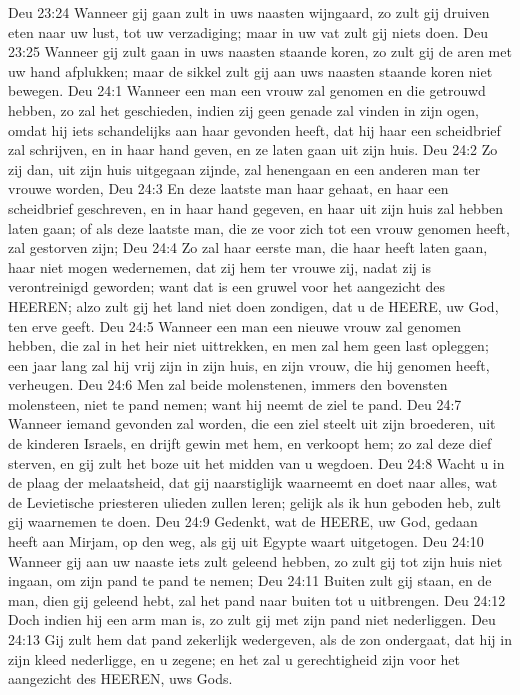 Deu 23:24  Wanneer gij gaan zult in uws naasten wijngaard, zo zult gij druiven eten naar uw lust, tot uw verzadiging; maar in uw vat zult gij niets doen.
Deu 23:25  Wanneer gij zult gaan in uws naasten staande koren, zo zult gij de aren met uw hand afplukken; maar de sikkel zult gij aan uws naasten staande koren niet bewegen.
Deu 24:1  Wanneer een man een vrouw zal genomen en die getrouwd hebben, zo zal het geschieden, indien zij geen genade zal vinden in zijn ogen, omdat hij iets schandelijks aan haar gevonden heeft, dat hij haar een scheidbrief zal schrijven, en in haar hand geven, en ze laten gaan uit zijn huis.
Deu 24:2  Zo zij dan, uit zijn huis uitgegaan zijnde, zal henengaan en een anderen man ter vrouwe worden,
Deu 24:3  En deze laatste man haar gehaat, en haar een scheidbrief geschreven, en in haar hand gegeven, en haar uit zijn huis zal hebben laten gaan; of als deze laatste man, die ze voor zich tot een vrouw genomen heeft, zal gestorven zijn;
Deu 24:4  Zo zal haar eerste man, die haar heeft laten gaan, haar niet mogen wedernemen, dat zij hem ter vrouwe zij, nadat zij is verontreinigd geworden; want dat is een gruwel voor het aangezicht des HEEREN; alzo zult gij het land niet doen zondigen, dat u de HEERE, uw God, ten erve geeft.
Deu 24:5  Wanneer een man een nieuwe vrouw zal genomen hebben, die zal in het heir niet uittrekken, en men zal hem geen last opleggen; een jaar lang zal hij vrij zijn in zijn huis, en zijn vrouw, die hij genomen heeft, verheugen.
Deu 24:6  Men zal beide molenstenen, immers den bovensten molensteen, niet te pand nemen; want hij neemt de ziel te pand.
Deu 24:7  Wanneer iemand gevonden zal worden, die een ziel steelt uit zijn broederen, uit de kinderen Israels, en drijft gewin met hem, en verkoopt hem; zo zal deze dief sterven, en gij zult het boze uit het midden van u wegdoen.
Deu 24:8  Wacht u in de plaag der melaatsheid, dat gij naarstiglijk waarneemt en doet naar alles, wat de Levietische priesteren ulieden zullen leren; gelijk als ik hun geboden heb, zult gij waarnemen te doen.
Deu 24:9  Gedenkt, wat de HEERE, uw God, gedaan heeft aan Mirjam, op den weg, als gij uit Egypte waart uitgetogen.
Deu 24:10  Wanneer gij aan uw naaste iets zult geleend hebben, zo zult gij tot zijn huis niet ingaan, om zijn pand te pand te nemen;
Deu 24:11  Buiten zult gij staan, en de man, dien gij geleend hebt, zal het pand naar buiten tot u uitbrengen.
Deu 24:12  Doch indien hij een arm man is, zo zult gij met zijn pand niet nederliggen.
Deu 24:13  Gij zult hem dat pand zekerlijk wedergeven, als de zon ondergaat, dat hij in zijn kleed nederligge, en u zegene; en het zal u gerechtigheid zijn voor het aangezicht des HEEREN, uws Gods.
